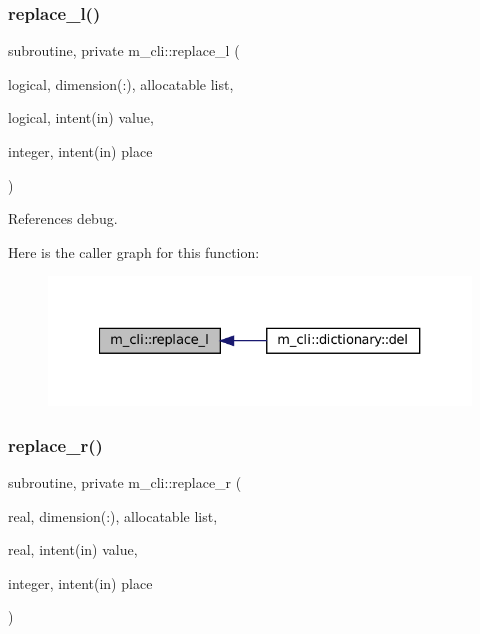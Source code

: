 \subsubsection{\texorpdfstring{replace\+\_\+l()}{replace\_l()}}
{\footnotesize\ttfamily subroutine, private m\+\_\+cli\+::replace\+\_\+l (\begin{DoxyParamCaption}\item[{logical, dimension(\+:), allocatable}]{list,  }\item[{logical, intent(in)}]{value,  }\item[{integer, intent(in)}]{place }\end{DoxyParamCaption})\hspace{0.3cm}{\ttfamily [private]}}



References debug.

Here is the caller graph for this function\+:
\nopagebreak
\begin{figure}[H]
\begin{center}
\leavevmode
\includegraphics[width=327pt]{namespacem__cli_a89ed5c3b944f91d8135173206fbc7e07_icgraph}
\end{center}
\end{figure}
\mbox{\label{namespacem__cli_ab3b33abc8a6da174d3f27c2f2203038c}} 
\subsubsection{\texorpdfstring{replace\+\_\+r()}{replace\_r()}}
{\footnotesize\ttfamily subroutine, private m\+\_\+cli\+::replace\+\_\+r (\begin{DoxyParamCaption}\item[{real, dimension(\+:), allocatable}]{list,  }\item[{real, intent(in)}]{value,  }\item[{integer, intent(in)}]{place }\end{DoxyParamCaption})\hspace{0.3cm}{\ttfamily [private]}}



